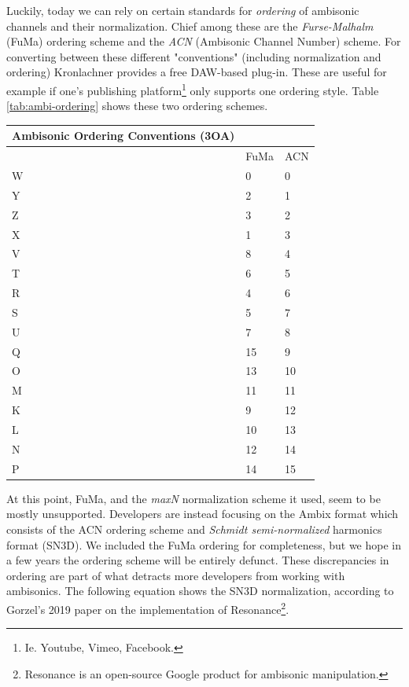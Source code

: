 
Luckily, today we can rely on certain standards for \textit{ordering} of ambisonic channels and their normalization. Chief among these are the \textit{Furse-Malhalm} (FuMa) ordering scheme and the \textit{ACN} (Ambisonic Channel Number) scheme. For converting between these different "conventions" (including normalization and ordering) Kronlachner \cite{kronlachner2014plug} provides a free DAW-based plug-in. These are useful for example if one's publishing platform\footnote{Ie. Youtube, Vimeo, Facebook.} only supports one ordering style. Table \ref{tab:ambi-ordering} shows these two ordering schemes. 


\begin{center}
    \begin{tabular}{ | l | l | l | }
    \hline
	Ambisonic Ordering Conventions (3OA) &  &  \\ \hline
	 & FuMa & ACN \\ \hline
	W & 0 & 0 \\ \hline
	Y & 2 & 1 \\ \hline
	Z & 3 & 2 \\ \hline
	X & 1 & 3 \\ \hline
	V & 8 & 4 \\ \hline
	T & 6 & 5 \\ \hline
	R & 4 & 6 \\ \hline
	S & 5 & 7 \\ \hline
	U & 7 & 8 \\ \hline
	Q & 15 & 9 \\ \hline
	O & 13 & 10 \\ \hline
	M & 11 & 11 \\ \hline
	K & 9 & 12 \\ \hline
	L & 10 & 13 \\ \hline
	N & 12 & 14 \\ \hline
	P & 14 & 15 \\ \hline
    \end{tabular}
    \label{tab:ambi-ordering}
\end{center}

At this point, FuMa, and the \textit{maxN} normalization scheme it used, seem to be mostly unsupported. Developers are instead focusing on the Ambix format which consists of the ACN ordering scheme and \textit{Schmidt semi-normalized} harmonics format (SN3D). We included the FuMa ordering for completeness, but we hope in a few years the ordering scheme will be entirely defunct. These discrepancies in ordering are part of what detracts more developers from working with ambisonics. The following equation shows the SN3D normalization, according to Gorzel's 2019 \cite{gorzel2019efficient} paper on the implementation of Resonance\footnote{Resonance is an open-source Google product for ambisonic manipulation.}. 

